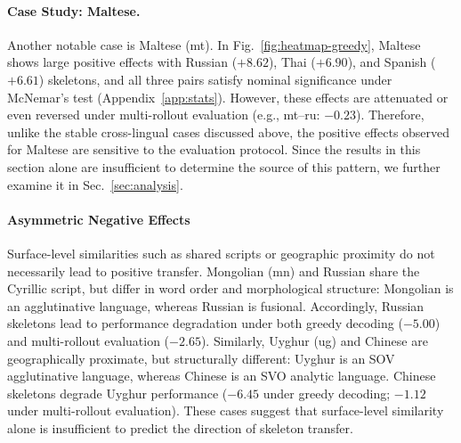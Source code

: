 \paragraph{Case Study: Maltese.}
Another notable case is Maltese (mt). In Fig.~\ref{fig:heatmap-greedy}, Maltese shows large positive effects with Russian ($+8.62$), Thai ($+6.90$), and Spanish ($+6.61$) skeletons, and all three pairs satisfy nominal significance under McNemar's test (Appendix~\ref{app:stats}). However, these effects are attenuated or even reversed under multi-rollout evaluation (e.g., mt--ru: $-0.23$). Therefore, unlike the stable cross-lingual cases discussed above, the positive effects observed for Maltese are sensitive to the evaluation protocol. Since the results in this section alone are insufficient to determine the source of this pattern, we further examine it in Sec.~\ref{sec:analysis}.

\paragraph{Asymmetric Negative Effects}
Surface-level similarities such as shared scripts or geographic proximity do not necessarily lead to positive transfer. Mongolian (mn) and Russian share the Cyrillic script, but differ in word order and morphological structure: Mongolian is an agglutinative language, whereas Russian is fusional. Accordingly, Russian skeletons lead to performance degradation under both greedy decoding ($-5.00$) and multi-rollout evaluation ($-2.65$). Similarly, Uyghur (ug) and Chinese are geographically proximate, but structurally different: Uyghur is an SOV agglutinative language, whereas Chinese is an SVO analytic language. Chinese skeletons degrade Uyghur performance ($-6.45$ under greedy decoding; $-1.12$ under multi-rollout evaluation). These cases suggest that surface-level similarity alone is insufficient to predict the direction of skeleton transfer.

